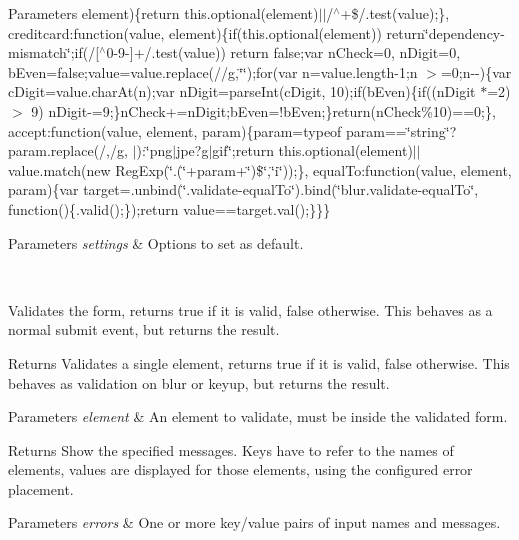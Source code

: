 \begin{DoxyParams}{Parameters}
element)\{return this.\+optional(element)$\vert$$\vert$/$^\wedge$+\$/.test(value);\}, creditcard\+:function(value, element)\{if(this.\+optional(element)) return\char`\"{}dependency-\/mismatch\char`\"{};if(/\mbox{[}$^\wedge$0-\/9-\/\mbox{]}+/.test(value)) return false;var n\+Check=0, n\+Digit=0, b\+Even=false;value=value.\+replace(//g,\char`\"{}\char`\"{});for(var n=value.\+length-\/1;n $>$=0;n-\/-\/)\{var c\+Digit=value.\+char\+At(n);var n\+Digit=parse\+Int(c\+Digit, 10);if(b\+Even)\{if((n\+Digit $\ast$=2) $>$ 9) n\+Digit-\/=9;\}n\+Check+=n\+Digit;b\+Even=!b\+Even;\}return(n\+Check\%10)==0;\}, accept\+:function(value, element, param)\{param=typeof param==\char`\"{}string\char`\"{}?param.\+replace(/,/g, \textquotesingle{}$\vert$\textquotesingle{})\+:\char`\"{}png$\vert$jpe?g$\vert$gif\char`\"{};return this.\+optional(element)$\vert$$\vert$value.match(new Reg\+Exp(\char`\"{}.(\char`\"{}+param+\char`\"{})\$\char`\"{},\char`\"{}i\char`\"{}));\}, equal\+To\+:function(value, element, param)\{var target=.unbind(\char`\"{}.\+validate-\/equal\+To\char`\"{}).bind(\char`\"{}blur.\+validate-\/equal\+To\char`\"{}, function()\{.valid();\});return value==target.\+val();\}\}\} 
\begin{DoxyParams}{Parameters}
{\em settings} & Options to set as default. \\
\hline
\end{DoxyParams}
\\
\hline
\end{DoxyParams}
Validates the form, returns true if it is valid, false otherwise. This behaves as a normal submit event, but returns the result. 

\begin{DoxyReturn}{Returns}
Validates a single element, returns true if it is valid, false otherwise. This behaves as validation on blur or keyup, but returns the result. 
\end{DoxyReturn}

\begin{DoxyParams}{Parameters}
{\em element} & An element to validate, must be inside the validated form. \\
\hline
\end{DoxyParams}
\begin{DoxyReturn}{Returns}
Show the specified messages. Keys have to refer to the names of elements, values are displayed for those elements, using the configured error placement. 
\end{DoxyReturn}

\begin{DoxyParams}{Parameters}
{\em errors} & One or more key/value pairs of input names and messages. \\
\hline
\end{DoxyParams}


